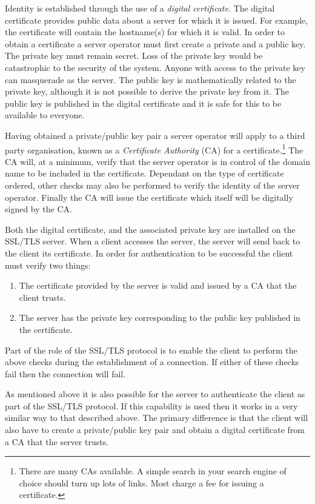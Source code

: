 Identity is established through the use of a \emph{digital certificate}. The 
digital certificate provides public data about a server for which it is issued. 
For example, the certificate will contain the hostname(s) for which it is 
valid. In order to obtain a certificate a server operator must first create a 
private and a public key. The private key must remain secret. Loss of the 
private key would be catastrophic to the security of the system. Anyone with 
access to the private key can masquerade as the server. The public key is 
mathematically related to the private key, although it is not possible to 
derive the private key from it. The public key is published in the digital 
certificate and it is safe for this to be available to everyone.

Having obtained a private/public key pair a server operator will apply to a 
third party organisation, known as a \emph{Certificate Authority} (CA) for a
certificate.\footnote{There are many CAs available. A simple search in your
search engine of choice should turn up lots of links. Most charge a fee for
issuing a certificate.} The CA will, at a minimum, verify that the server 
operator is in control of the domain name to be included in the certificate. 
Dependant on the type of certificate ordered, other checks may also be 
performed to verify the identity of the server operator. Finally the CA will 
issue the certificate which itself will be digitally signed by the CA.

Both the digital certificate, and the associated private key are installed on 
the SSL/TLS server. When a client accesses the server, the server will send 
back to the client its certificate. In order for authentication to be 
successful the client must verify two things:
\begin{enumerate}
\item The certificate provided by the server is valid and issued by a CA that 
the client trusts.
\item The server has the private key corresponding to the public key published 
in the certificate.
\end{enumerate}

Part of the role of the SSL/TLS protocol is to enable the client to perform the 
above checks during the establishment of a connection. If either of these 
checks fail then the connection will fail.

As mentioned above it is also possible for the server to authenticate the 
client as part of the SSL/TLS protocol. If this capability is used then it works
in a very similar way  to that described above. The primary difference is that
the client will also have to create a private/public key pair and obtain a
digital certificate from a CA that the server trusts. 

